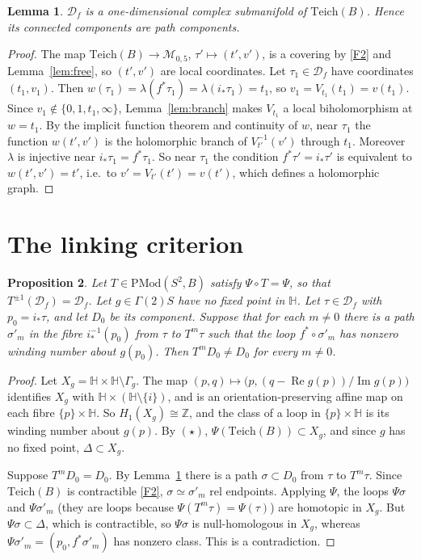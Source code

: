 \documentclass[11pt]{article}
\newtheorem{proposition}{Proposition}[section]
\newtheorem{lemma}[proposition]{Lemma}
\theoremstyle{definition}
\newcommand{\Teich}{\mathrm{Teich}}
\newcommand{\PMod}{\mathrm{PMod}}
\newcommand{\HH}{\mathbb H}
\newcommand{\D}{\mathcal D}
\newcommand{\M}{\mathcal M}
\newcommand{\Img}{\operatorname{Im}}
\newcommand{\Rea}{\operatorname{Re}}
\begin{document}
\begin{lemma}\label{lem:smooth}
$\D_f$ is a one-dimensional complex submanifold of $\Teich(B)$. Hence its connected components are path components.
\end{lemma}

\begin{proof}
The map $\Teich(B)\to\M_{0,5}$, $\tau'\mapsto(t',v')$, is a covering by \ref{F2} and Lemma~\ref{lem:free}, so $(t',v')$ are local coordinates. Let $\tau_1\in\D_f$ have coordinates $(t_1,v_1)$. Then $w(\tau_1)=\lambda(f^*\tau_1)=\lambda(i_*\tau_1)=t_1$, so $v_1=V_{t_1}(t_1)=v(t_1)$. Since $v_1\notin\{0,1,t_1,\infty\}$, Lemma~\ref{lem:branch} makes $V_{t_1}$ a local biholomorphism at $w=t_1$. By the implicit function theorem and continuity of $w$, near $\tau_1$ the function $w(t',v')$ is the holomorphic branch of $V_{t'}^{-1}(v')$ through $t_1$. Moreover $\lambda$ is injective near $i_*\tau_1=f^*\tau_1$. So near $\tau_1$ the condition $f^*\tau'=i_*\tau'$ is equivalent to $w(t',v')=t'$, i.e.\ to $v'=V_{t'}(t')=v(t')$, which defines a holomorphic graph.
\end{proof}

\section{The linking criterion}

\begin{proposition}\label{prop:linking}
Let $T\in\PMod(S^2,B)$ satisfy $\Psi\circ T=\Psi$, so that $T^{\pm1}(\D_f)=\D_f$. Let $g\in\Gamma(2)S$ have no fixed point in $\HH$. Let $\tau\in\D_f$ with $p_0=i_*\tau$, and let $D_0$ be its component. Suppose that for each $m\ne0$ there is a path $\sigma'_m$ in the fibre $i_*^{-1}(p_0)$ from $\tau$ to $T^m\tau$ such that the loop $f^*\circ\sigma'_m$ has nonzero winding number about $g(p_0)$. Then $T^m D_0\ne D_0$ for every $m\ne0$.
\end{proposition}

\begin{proof}
Let $X_g=\HH\times\HH\setminus\Gamma_g$. The map $(p,q)\mapsto\bigl(p,(q-\Rea g(p))/\Img g(p)\bigr)$ identifies $X_g$ with $\HH\times(\HH\setminus\{i\})$, and is an orientation-preserving affine map on each fibre $\{p\}\times\HH$. So $H_1(X_g)\cong\mathbb Z$, and the class of a loop in $\{p\}\times\HH$ is its winding number about $g(p)$. By $(\star)$, $\Psi(\Teich(B))\subset X_g$, and since $g$ has no fixed point, $\Delta\subset X_g$.

Suppose $T^mD_0=D_0$. By Lemma~\ref{lem:smooth} there is a path $\sigma\subset D_0$ from $\tau$ to $T^m\tau$. Since $\Teich(B)$ is contractible \ref{F2}, $\sigma\simeq\sigma'_m$ rel endpoints. Applying $\Psi$, the loops $\Psi\sigma$ and $\Psi\sigma'_m$ (they are loops because $\Psi(T^m\tau)=\Psi(\tau)$) are homotopic in $X_g$. But $\Psi\sigma\subset\Delta$, which is contractible, so $\Psi\sigma$ is null-homologous in $X_g$, whereas $\Psi\sigma'_m=(p_0,f^*\sigma'_m)$ has nonzero class. This is a contradiction.
\end{proof}
\end{document}
